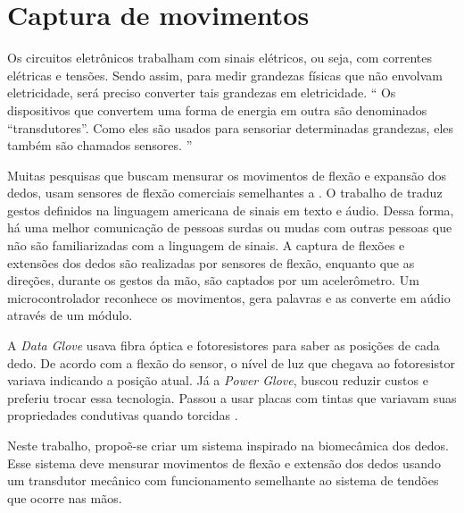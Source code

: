 \documentclass[
	12pt,				%
	openright,			%
	oneside,			%
	a4paper,			%
	english,			%
	brazil				%
	]{abntex2}
\begin{document}
		
		\section{Captura de movimentos}



		Os circuitos eletrônicos trabalham com sinais elétricos, ou seja, com correntes elétricas e tensões. Sendo assim, para medir grandezas físicas que não envolvam eletricidade, será preciso converter tais grandezas em eletricidade. `` Os dispositivos que convertem uma forma de energia em outra são denominados “transdutores”. Como eles são usados para sensoriar determinadas grandezas, eles também são chamados sensores. '' \cite{ncb2012eletronicabasica}


		Muitas pesquisas que buscam mensurar os movimentos de flexão e expansão dos dedos, usam sensores de flexão comerciais semelhantes a \cite{flexsensor}. O trabalho de \cite{anbarasi2013deafmute} traduz gestos definidos na linguagem americana de sinais em texto e áudio. Dessa forma, há uma melhor comunicação de pessoas surdas ou mudas com outras pessoas que não são familiarizadas com a linguagem de sinais. A captura de flexões e extensões dos dedos são realizadas por sensores de flexão, enquanto que as direções, durante os gestos da mão, são captados por um acelerômetro. Um microcontrolador reconhece os movimentos, gera palavras e as converte em aúdio através de um módulo. 

		A \textit{Data Glove} usava fibra óptica e fotoresistores para saber as posições de cada dedo. De acordo com a flexão do sensor, o nível de luz que chegava ao fotoresistor variava indicando a posição atual. Já a \textit{Power Glove}, buscou reduzir custos e preferiu trocar essa tecnologia. Passou a usar placas com tintas que variavam suas propriedades condutivas quando torcidas \cite{dana1989powerglove}.

		Neste trabalho, propo\~e-se criar um sistema inspirado na biomecâmica dos dedos. Esse sistema deve mensurar movimentos de flexão e extensão dos dedos usando um transdutor mecânico com funcionamento semelhante ao sistema de tendões que ocorre nas mãos. 
\end{document}
